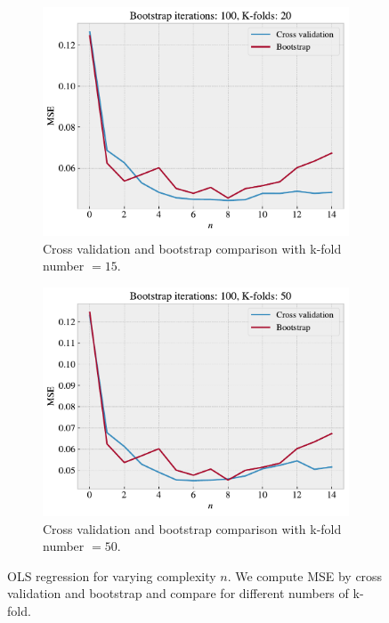 \documentclass[norsk,a4paper,12pt]{scrartcl}
\begin{document}
\begin{figure}[H]
\begin{subfigure}[b]{0.49\textwidth}
     \end{subfigure}
     \hfill
     \begin{subfigure}[b]{0.49\textwidth}
         \centering
         \includegraphics[width=\textwidth]{figures/CV_boot_comparison_with_k20.pdf}
         \caption{Cross validation and bootstrap comparison with k-fold number $=15$. }
         \label{fig:cv_b_20}
     \end{subfigure}
     \hfill
     \begin{subfigure}[b]{0.49\textwidth}
         \centering
         \includegraphics[width=\textwidth]{figures/CV_boot_comparison_with_k50.pdf}
         \caption{Cross validation and bootstrap comparison with k-fold number $=50$. }
         \label{fig:cv_b_50}
     \end{subfigure}
     
        \caption{OLS regression for varying complexity $n$. We compute  MSE by cross validation and bootstrap and compare for different numbers of k-fold. }
        \label{fig:CV_boot_comp}
\end{figure}
\end{document}
